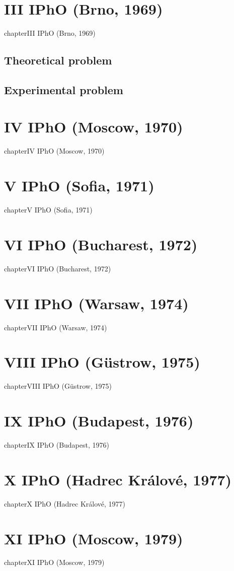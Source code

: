 \documentclass[12pt,a4paper]{book}
\begin{document}
\chapter*{III IPhO (Brno, 1969)}
{chapter}{III IPhO (Brno, 1969)}
\section*{Theoretical problem}
	
\section*{Experimental problem}
\chapter*{IV IPhO (Moscow, 1970)}
{chapter}{IV IPhO (Moscow, 1970)}
\chapter*{V IPhO (Sofia, 1971)}
{chapter}{V IPhO (Sofia, 1971)}
\chapter*{VI IPhO (Bucharest, 1972)}
{chapter}{VI IPhO (Bucharest, 1972)}
\chapter*{VII IPhO (Warsaw, 1974)}
{chapter}{VII IPhO (Warsaw, 1974)}
\chapter*{VIII IPhO (G\"ustrow, 1975)}
{chapter}{VIII IPhO (G\"ustrow, 1975)}
\chapter*{IX IPhO (Budapest, 1976)}
{chapter}{IX IPhO (Budapest, 1976)}
\chapter*{X IPhO (Hadrec Kr\'alov\'e, 1977)}
{chapter}{X IPhO (Hadrec Kr\'alov\'e, 1977)}
\chapter*{XI IPhO (Moscow, 1979)}
{chapter}{XI IPhO (Moscow, 1979)}
\end{document}

